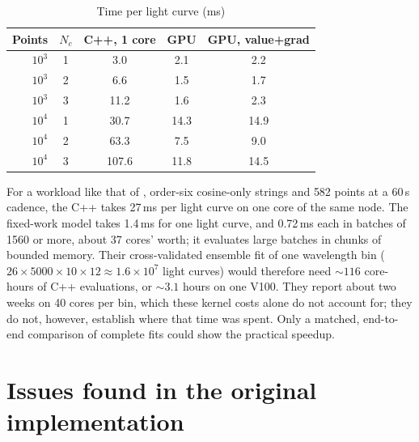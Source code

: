 \documentclass[twocolumn]{aastex701}
\begin{document}
\begin{table}[t]
\centering
\caption{Time per light curve (ms)\label{tab:timing}}
\begin{tabular}{rcccc}
\hline\hline
Points & $N_c$ & C++, 1 core & GPU & GPU, value+grad \\
\hline
$10^3$ & 1 & 3.0 & 2.1 & 2.2 \\
$10^3$ & 2 & 6.6 & 1.5 & 1.7 \\
$10^3$ & 3 & 11.2 & 1.6 & 2.3 \\
$10^4$ & 1 & 30.7 & 14.3 & 14.9 \\
$10^4$ & 2 & 63.3 & 7.5 & 9.0 \\
$10^4$ & 3 & 107.6 & 11.8 & 14.5 \\
\hline
\end{tabular}
\end{table}

For a workload like that of \citet{alderson2026}, order-six cosine-only
strings and 582 points at a 60\,s cadence, the C++ takes 27\,ms per light
curve on one core of the same node. The fixed-work model takes 1.4\,ms
for one light curve, and 0.72\,ms each in batches of 1560 or more, about
37 cores' worth; it evaluates large batches in chunks of bounded memory.
Their cross-validated ensemble fit of one wavelength bin
($26\times5000\times10\times12 \approx 1.6\times10^7$ light curves)
would therefore need ${\sim}116$ core-hours of C++ evaluations, or
${\sim}3.1$ hours on one V100. They report about two weeks on 40 cores
per bin, which these kernel costs alone do not account for; they do not,
however, establish where that time was spent. Only a matched, end-to-end
comparison of complete fits could show the practical speedup.

\section{Issues found in the original implementation}
\label{sec:issues}
\end{document}
